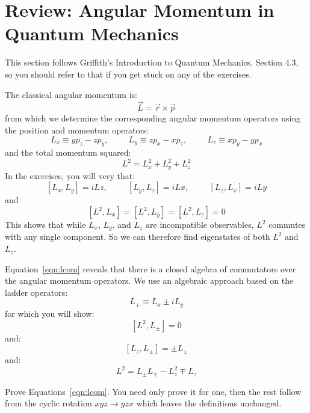 \documentclass[12pt]{article}
\begin{document}
\section{Review: Angular Momentum in Quantum Mechanics}

This section follows Griffith's Introduction to Quantum Mechanics,
Section 4.3, so you should refer to that if you get stuck on any of
the exercises.

The classical angular momentum is:
$$\vec{L} = \vec{r} \times \vec{p}$$
from which we determine the corresponding angular momentum operators using the position and momentum operators:
$$L_x \equiv y p_z - z p_y, \hspace{1cm} L_y \equiv z p_x - x p_z, \hspace{1cm} L_z \equiv x p_y - y p_x$$
and the total momentum squared:
$$L^2 = L_x^2 + L_y^2 +L_z^2$$
In the exercises, you will very that:
\begin{equation}
\label{eqn:lcom}
      [L_x,L_y] = i Lz, \hspace{1cm} [L_y,L_z] = i Lx, \hspace{1cm} [L_z,L_x] = i Ly
\end{equation}
and
\begin{equation}
\label{eqn:lsqcom}
      [L^2,L_x] = [L^2,L_y] = [L^2,L_z] = 0
\end{equation}
This shows that while $L_x$, $L_y$, and $L_z$ are incompatible
observables, $L^2$ commutes with any single component.  So we can
therefore find eigenstates of both $L^2$ and $L_z$.

Equation~\ref{eqn:lcom} reveals that there is a closed algebra of
commutators over the angular momentum operators.  We use an algebraic
approach based on the ladder operators:
$$L_{\pm} \equiv L_x \pm i L_y$$
for which you will show:
\begin{equation}
\label{eqn:lsqlpmcom}
     [L^2,L_{\pm}] = 0
\end{equation}
and:
\begin{equation}
\label{eqn:lzlpmcom}
     [L_z,L_{\pm}] = \pm  L_{\pm}
\end{equation}
and:
\begin{equation}
\label{eqn:ltop}
     L^2 = L_{\pm} L_{\mp} - L_z^2 \mp  L_z
\end{equation}


\exercise Prove Equations~\ref{eqn:lcom}.  You need only prove it for one, then the rest follow from the cyclic rotation $xyz \to yzx$ which leaves the definitions unchanged.\\[5pt]
\end{document}
